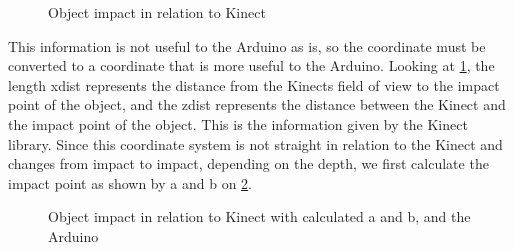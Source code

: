\begin{figure}[h]
	\centering
	\caption{Object impact in relation to Kinect}
	\label{FieldOfView}
\end{figure}

This information is not useful to the Arduino as is, so the coordinate must be converted to a coordinate that is more useful to the Arduino.
Looking at \ref{FieldOfView}, the length xdist represents the distance from the Kinects field of view to the impact point of the object, and the zdist represents the distance between the Kinect and the impact point of the object. This is the information given by the Kinect library.
Since this coordinate system is not straight in relation to the Kinect and changes from impact to impact, depending on the depth, we first calculate the impact point as shown by a and b on \ref{FieldOfView2}.

\begin{figure}[h]
	\centering
	\caption{Object impact in relation to Kinect with calculated a and b, and the Arduino}
	\label{FieldOfView2}
\end{figure}

